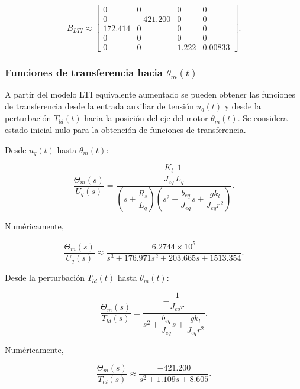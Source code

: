 \documentclass[10pt,a4paper]{article}
\begin{document}
\begin{equation}
    B_{LTI}\approx
    \begin{bmatrix}
        0 & 0 & 0 & 0\\
        0 & -421.200 & 0 & 0\\
        172.414 & 0 & 0 & 0\\
        0 & 0 & 0 & 0\\
        0 & 0 & 1.222 & 0.00833
    \end{bmatrix}.
    \label{eq:b_lti_numerica}
\end{equation}

\subsubsection{Funciones de transferencia hacia \(\theta_m(t)\)}

A partir del modelo LTI equivalente aumentado se pueden obtener las funciones de transferencia desde la entrada auxiliar de tensión \(u_q(t)\) y desde la perturbación \(T_{ld}(t)\) hacia la posición del eje del motor \(\theta_m(t)\). Se considera estado inicial nulo para la obtención de funciones de transferencia.

Desde \(u_q(t)\) hasta \(\theta_m(t)\):

\begin{equation}
    \frac{\Theta_m(s)}{U_q(s)}
    =
    \frac{
    \dfrac{K_t}{J_{eq}}\dfrac{1}{L_q}
    }{
    \left(s+\dfrac{R_s}{L_q}\right)
    \left(
    s^2+\dfrac{b_{eq}}{J_{eq}}s+\dfrac{gk_l}{J_{eq}r^2}
    \right)
    }.
    \label{eq:ft_theta_uq_simbolica}
\end{equation}

Numéricamente,

\begin{equation}
    \frac{\Theta_m(s)}{U_q(s)}
    \approx
    \frac{6.2744\times10^{5}}{s^3+176.971s^2+203.665s+1513.354}.
    \label{eq:ft_theta_uq_numerica}
\end{equation}

Desde la perturbación \(T_{ld}(t)\) hasta \(\theta_m(t)\):

\begin{equation}
    \frac{\Theta_m(s)}{T_{ld}(s)}
    =
    \frac{
    -\dfrac{1}{J_{eq}r}
    }{
    s^2+\dfrac{b_{eq}}{J_{eq}}s+\dfrac{gk_l}{J_{eq}r^2}
    }.
    \label{eq:ft_theta_tld_simbolica}
\end{equation}

Numéricamente,

\begin{equation}
    \frac{\Theta_m(s)}{T_{ld}(s)}
    \approx
    \frac{-421.200}{s^2+1.109s+8.605}.
    \label{eq:ft_theta_tld_numerica}
\end{equation}
\end{document}
